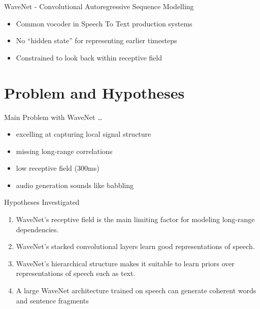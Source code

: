 \documentclass[
  ignorenonframetext,
]{beamer}
\providecommand{\tightlist}{%
  \setlength{\itemsep}{0pt}\setlength{\parskip}{0pt}}
\begin{document}
\begin{frame}{WaveNet - Convolutional Autoregressive Sequence Modelling}
\protect\hypertarget{wavenet---convolutional-autoregressive-sequence-modelling}{}
\begin{figure}
    \centering
    \resizebox{0.7\columnwidth}{!}{
    }
\end{figure}

\begin{itemize}
\tightlist
\item
  Common vocoder in Speech To Text production systems
\item
  No ``hidden state'' for representing earlier timesteps
\item
  Constrained to look back within receptive field
\end{itemize}
\end{frame}

\hypertarget{problem-and-hypotheses}{%
\section{Problem and Hypotheses}\label{problem-and-hypotheses}}

\begin{frame}{Main Problem with WaveNet \ldots{}}
\protect\hypertarget{main-problem-with-wavenet}{}
\begin{itemize}
\tightlist
\item
  excelling at capturing local signal structure
\item
  missing long-range correlations
\item
  low receptive field (300ms)
\item
  audio generation sounds like babbling
\end{itemize}
\end{frame}

\begin{frame}{Hypotheses Investigated}
\protect\hypertarget{hypotheses-investigated}{}
\begin{enumerate}
\tightlist
\item
  WaveNet's receptive field is the main limiting factor for modeling
  long-range dependencies.
\item
  WaveNet's stacked convolutional layers learn good representations of
  speech.
\item
  WaveNet's hierarchical structure makes it suitable to learn priors
  over representations of speech such as text.
\item
  A large WaveNet architecture trained on speech can generate coherent
  words and sentence fragments
\end{enumerate}
\end{frame}
\end{document}
